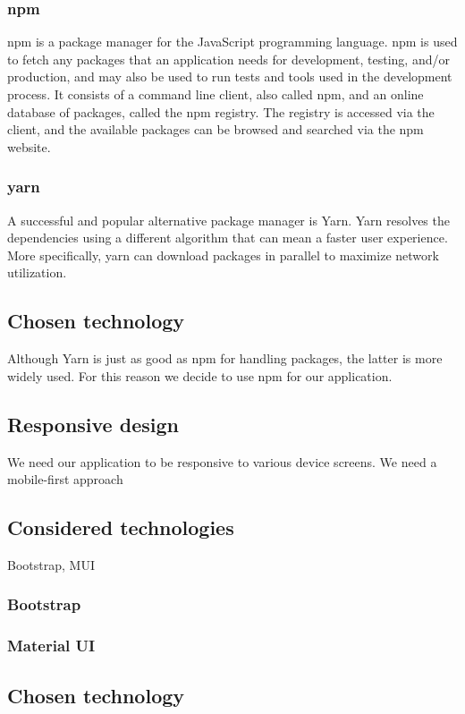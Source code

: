 \subsubsection*{npm}
npm is a package manager for the JavaScript programming language.
npm is used to fetch any packages that an application needs for development, testing, and/or production, and may also be used to run tests and tools used in the development process.
It consists of a command line client, also called npm, and an online database of packages, called the npm registry. 
The registry is accessed via the client, and the available packages can be browsed and searched via the npm website.

\subsubsection*{yarn}
A successful and popular alternative package manager is Yarn. 
Yarn resolves the dependencies using a different algorithm that can mean a faster user experience.
More specifically, yarn can download packages in parallel to maximize network utilization.

\subsection*{Chosen technology}
Although Yarn is just as good as npm for handling packages, the latter is more widely used.
For this reason we decide to use npm for our application. 

\subsection{Responsive design}
We need our application to be responsive to various device screens.
We need a mobile-first approach

\subsection*{Considered technologies}
Bootstrap, MUI
\subsubsection*{Bootstrap}

\subsubsection*{Material UI}

\subsection*{Chosen technology}



